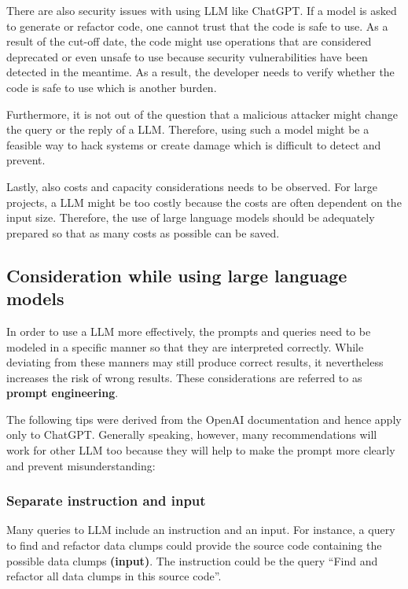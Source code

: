 There are also security issues with using  \ac{LLM} like ChatGPT. If a model is asked to generate or refactor code, one cannot trust that the code is safe to use. As a result of the cut-off date, the code might use operations that are considered deprecated or even unsafe to use because security vulnerabilities have been detected in the meantime. As a result, the developer needs to verify whether the code is safe to use which is another burden.  \cite{pearce2021asleep}

Furthermore, it is not out of the question that a malicious attacker might change the query or the reply of a \ac{LLM}. Therefore, using such a model might be a feasible way to hack systems or create damage which is difficult to detect and prevent. \cite{not_what_you_signed_for}

Lastly, also costs and capacity considerations needs to be observed. For large projects, a \ac{LLM} might be too costly because  the costs are often dependent on the input size. Therefore, the use of large language models should be adequately prepared so that as many costs as possible can be saved.  \cite{chen2023frugalgpt}



\subsection{Consideration while using large language models}
In order to use a \ac{LLM} more effectively, the prompts and queries need to be modeled in a specific manner so that they are interpreted correctly. While deviating from these manners may still produce correct results, it nevertheless increases the risk of wrong results. These considerations are  referred to as \textbf{prompt engineering}.

The following tips were derived from the OpenAI documentation \cite{ChatGPT_url} and hence apply only to ChatGPT. Generally speaking, however, many recommendations will work for other \ac{LLM} too because they will help to make the prompt more clearly and prevent misunderstanding:

\subsubsection{Separate instruction and input}
Many queries to \ac{LLM} include an instruction and an input. For instance, a query to find and refactor data clumps could provide the source code containing the possible data clumps \textbf{(input)}. The instruction could be the query \enquote{Find and refactor all data clumps in this source code}. 

